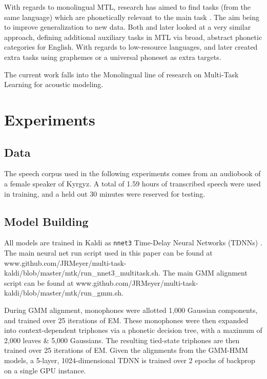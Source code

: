 \documentclass[a4paper]{article}
\begin{document}
With regards to monolingual MTL, research has aimed to find tasks (from the same language) which are phonetically relevant to the main task \cite{bell2015}. The aim being to improve generalization to new data. Both \cite{seltzer2013} and later \cite{huang2015} looked at a very similar approach, defining additional auxiliary tasks in MTL via broad, abstract phonetic categories for English. With regards to low-resource languages, \cite{chen2014} and later \cite{chen2015} created extra tasks using graphemes or a universal phoneset as extra targets.

The current work falls into the Monolingual line of research on Multi-Task Learning for acoustic modeling.


\section{Experiments}


\subsection{Data}

The speech corpus used in the following experiments comes from an audiobook of a female speaker of Kyrgyz. A total of 1.59 hours of transcribed speech were used in training, and a held out 30 minutes were reserved for testing.


\subsection{Model Building}

All models are trained in Kaldi as \texttt{nnet3} Time-Delay Neural Networks (TDNNs) \cite{povey2011,peddinti2015}. The main neural net run script used in this paper can be found at www.github.com/JRMeyer/multi-task-kaldi/blob/master/mtk/run\_nnet3\_multitask.sh. The main GMM alignment script can be found at www.github.com/JRMeyer/multi-task-kaldi/blob/master/mtk/run\_gmm.sh.

During GMM alignment, monophones were allotted 1,000 Gaussian components, and trained over 25 iterations of EM. These monophones were then expanded into context-dependent triphones via a phonetic decision tree, with a maximum of 2,000 leaves \& 5,000 Gaussians. The resulting tied-state triphones are then trained over 25 iterations of EM. Given the alignments from the GMM-HMM models, a 5-layer, 1024-dimensional TDNN is trained over 2 epochs of backprop on a single GPU instance.
\end{document}
